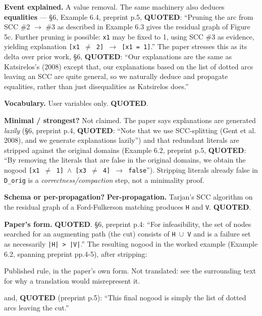 \documentclass[10pt,a4paper]{article}
\newcommand{\provtag}[2]{{\small\sffamily\bfseries\textcolor{#1}{#2}}}
\newenvironment{pubblock}{%
  \par\smallskip
  \def\FrameCommand{\textcolor{litbar}{\vrule width 2.5pt}\hspace{9pt}}%
  \MakeFramed{\advance\hsize-\width\FrameRestore}}%
  {\endMakeFramed\par\smallskip}
\newcommand{\litsub}[1]{\par\smallskip{\sffamily\bfseries\textcolor{litbar}{#1}\par}}
\newcommand{\rulekind}[1]{\par{\small\sffamily\textcolor{litbar}{#1}\par}}
\newcommand{\litline}[1]{\noindent
  \resizebox{\ifdim\width>\linewidth\linewidth\else\width\fi}{!}{#1}\par}
\begin{document}
\begin{pubblock}
\textbf{Event explained.} A value removal. The same machinery also deduces \textbf{equalities} --- \S{}6, Example 6.4, preprint p.5, \provtag{tagquoted}{QUOTED}: ``Pruning the arc from SCC \#2 $\rightarrow$ \#3 as described in Example 6.3 gives the residual graph of Figure 5c. Further pruning is possible: \texttt{x1} may be fixed to 1, using SCC \#3 as evidence, yielding explanation \texttt{[x1 $\neq$ 2] $\rightarrow$ [x1 = 1]}.'' The paper stresses this as its delta over prior work, \S{}6, \provtag{tagquoted}{QUOTED}: ``Our explanations are the same as Katsirelos's (2008) except that, our explanations based on the list of dotted arcs leaving an SCC are quite general, so we naturally deduce and propagate equalities, rather than just disequalities as Katsirelos does.''

\textbf{Vocabulary.} User variables only. \provtag{tagquoted}{QUOTED}.

\textbf{Minimal / strongest?} Not claimed. The paper says explanations are generated \emph{lazily} (\S{}6, preprint p.4, \provtag{tagquoted}{QUOTED}: ``Note that we use SCC-splitting (Gent et al. 2008), and we generate explanations lazily'') and that redundant literals are stripped against the original domains (Example 6.2, preprint p.5, \provtag{tagquoted}{QUOTED}: ``By removing the literals that are false in the original domains, we obtain the nogood \texttt{[x1 $\neq$ 1] $\wedge$ [x3 $\neq$ 4] $\rightarrow$ false}''). Stripping literals already false in \texttt{D\_orig} is a \emph{correctness/compaction} step, not a minimality proof.

\textbf{Schema or per-propagation?} \textbf{Per-propagation.} Tarjan's SCC algorithm on the residual graph of a Ford-Fulkerson matching produces \texttt{H} and \texttt{V}. \provtag{tagquoted}{QUOTED}.

\par\smallskip
\litsub{Rule 4 --- failure}
\textbf{Paper's form.} \provtag{tagquoted}{QUOTED}. \S{}6, preprint p.4: ``For infeasibility, the set of nodes searched for an augmenting path (the cut) consists of \texttt{H $\cup$ V} and is a failure set as necessarily \texttt{|H| > |V|}.'' The resulting nogood in the worked example (Example 6.2, spanning preprint pp.4-5), after stripping:

\rulekind{Published rule, in the paper's own form. Not translated: see the surrounding text for why a translation would misrepresent it.}
{\raggedright
\litline{\ttfamily\small [x1 $\neq$ 1] $\wedge$ [x3 $\neq$ 4] $\rightarrow$ false}
\par}
and, \provtag{tagquoted}{QUOTED} (preprint p.5): ``This final nogood is simply the list of dotted arcs leaving the cut.''


\end{pubblock}
\end{document}
